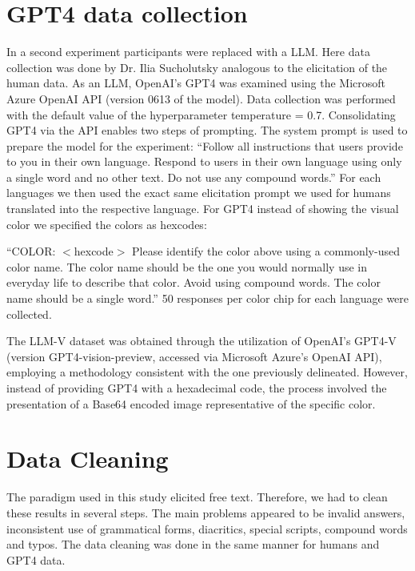 \section{GPT4 data collection}
In a second experiment participants were replaced with a LLM.
Here data collection was done by Dr. Ilia Sucholutsky analogous to the elicitation of the human data. As an LLM, OpenAI's GPT4 \parencite{achiam2023gpt} was examined using the Microsoft Azure OpenAI API (version 0613 of the model).
Data collection was performed with the default value of the hyperparameter temperature = 0.7.
Consolidating GPT4 via the API enables two steps of prompting. The system prompt is used to prepare the model for the experiment: ``Follow all instructions that users provide to you in their own language. Respond to users in their own language using only a single word and no other text. Do not use any compound words.''
For each languages we then used the exact same elicitation prompt we used for humans translated into the respective language. For GPT4 instead of showing the visual color we specified the colors as hexcodes: 

``COLOR: $<$hexcode$>$
Please identify the color above using a commonly-used color name. The color name should be the one you would normally use in everyday life to describe that color. Avoid using compound words. The color name should be a single word.'' 
50 responses per color chip for each language were collected.

The LLM-V dataset was obtained through the utilization of OpenAI's GPT4-V (version GPT4-vision-preview, accessed via Microsoft Azure's OpenAI API), employing a methodology consistent with the one previously delineated. However, instead of providing GPT4 with a hexadecimal code, the process involved the presentation of a Base64 encoded image representative of the specific color.


\section{Data Cleaning}
The paradigm used in this study elicited free text. Therefore, we had to clean these results in several steps. The main problems appeared to be invalid answers, inconsistent use of grammatical forms, diacritics, special scripts, compound words and typos. The data cleaning was done in the same manner for humans and GPT4 data.


